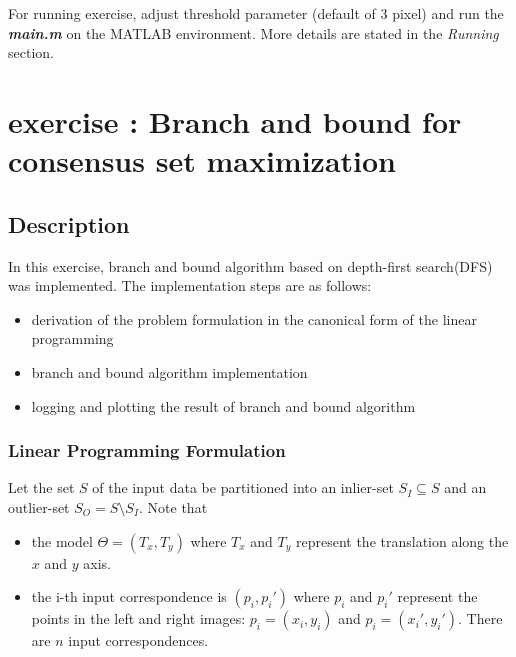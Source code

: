 \documentclass[paper=a4, fontsize=11pt]{scrartcl} %
\numberwithin{equation}{section} %
\numberwithin{figure}{section} %
\numberwithin{table}{section} %
\newcommand{\filename}[1]{\textbf{\textit{#1}}}
\begin{document}
For running exercise, adjust threshold parameter (default of 3 pixel) and run the \filename{main.m} on the MATLAB environment. More details are stated in the \textit{Running} section.


\section{exercise : Branch and bound for consensus set maximization}

\subsection{Description}




In this exercise, branch and bound algorithm based on depth-first search(DFS) was implemented. The implementation steps are as follows: 

\begin{itemize}
\item derivation of the problem formulation in the canonical form of the linear programming
\item branch and bound algorithm implementation
\item logging and plotting the result of branch and bound algorithm
\end{itemize}  

\subsubsection{Linear Programming Formulation}

Let the set $S$ of the input data be partitioned into an inlier-set $S_{I} \subseteq S$ and an outlier-set $S_{O} = S \setminus S_{I}$. Note that  

\begin{itemize}
\item the model $\Theta = (T_{x}, T_{y})$ where $T_{x}$ and $T_{y}$ represent the translation along the $x$ and $y$ axis.
\item the i-th input correspondence is $(p_{i}, p_{i}')$ where $p_{i}$ and $p_{i}'$ represent the points in the left and right images: $p_{i} = (x_{i}, y_{i})$ and $p_{i} = (x_{i}', y_{i}')$. There are $n$ input correspondences.
\end{itemize}
\end{document}

